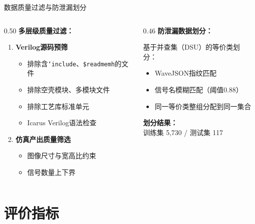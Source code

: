 \documentclass[aspectratio=169,10pt]{beamer}
\begin{document}
\begin{frame}{数据质量过滤与防泄漏划分}
\begin{columns}[T]
\begin{column}{0.50\textwidth}
\textbf{多层级质量过滤：}
\begin{enumerate}
  \item \textbf{Verilog源码预筛}
  \begin{itemize}
    \item 排除含\texttt{`include}、\texttt{\$readmemh}的文件
    \item 排除空壳模块、多模块文件
    \item 排除工艺库标准单元
    \item Icarus Verilog语法检查
  \end{itemize}
  \item \textbf{仿真产出质量筛选}
  \begin{itemize}
    \item 图像尺寸与宽高比约束
    \item 信号数量上下界
  \end{itemize}
\end{enumerate}
\end{column}
\begin{column}{0.46\textwidth}
\textbf{防泄漏数据划分：}

基于并查集（DSU）的等价类划分：
\begin{itemize}
  \item WaveJSON指纹匹配
  \item 信号名模糊匹配（阈值0.88）
  \item 同一等价类\alert{整组分配}到同一集合
\end{itemize}

\vspace{0.5em}
\textbf{划分结果：}\\
训练集 5,730 / 测试集 117
\end{column}
\end{columns}
\end{frame}

\section{评价指标}
\end{document}
